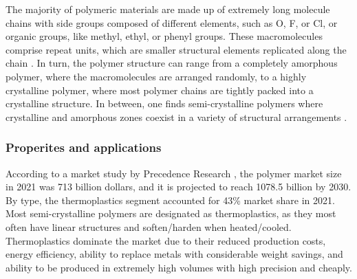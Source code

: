 The majority of polymeric materials are made up of extremely long molecule chains with side groups composed of different elements, such as O, F, or Cl, or organic groups, like methyl, ethyl, or phenyl groups.
These macromolecules comprise repeat units, which are smaller structural elements replicated along the chain \citep{callister2014materials}.
In turn, the polymer structure can range from a completely amorphous polymer, where the macromolecules are arranged randomly, to a highly crystalline polymer, where most polymer chains are tightly packed into a crystalline structure.
In between, one finds semi-crystalline polymers where crystalline and amorphous zones coexist in a variety of structural arrangements \citep{wardIntroductionMechanicalProperties2004}.

\subsubsection{Properites and applications}

According to a market study by Precedence Research \citep{precedenceresearchPolymersMarketProduct2022}, the polymer market size in 2021 was 713 billion dollars, and it is projected to reach 1078.5 billion by 2030.
By type, the thermoplastics segment accounted for 43\% market share in 2021.
Most semi-crystalline polymers are designated as thermoplastics, as they most often have linear structures and soften/harden when heated/cooled.
Thermoplastics dominate the market due to their reduced production costs, energy efficiency, ability to replace metals with considerable weight savings, and ability to be produced in extremely high volumes with high precision and cheaply.

